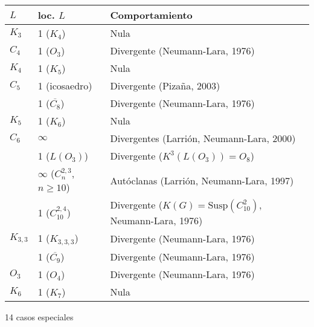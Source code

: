 \documentclass[beamer]{standalone}
\begin{document}
\SetVertexSimple[FillColor=gray, MinSize=0.7pt, InnerSep=0.7pt, LineWidth=0.5pt]


\setlength{\fboxsep}{1pt}

\begin{standaloneframe}
    \begin{center}
    \scriptsize
    \begin{tabular}{|M|M|l|}
      \hline
      $L$ & loc. $L$ & Comportamiento\\
      \hline
      $K_{3}$ & 1 ($K_{4}$) & Nula\\
      $C_{4}$ & 1 ($O_{3}$) & Divergente (Neumann-Lara, 1976)\\
      $K_{4}$ & 1 ($K_{5}$) & Nula\\
      $C_{5}$ & 1 (icosaedro) & Divergente (Pizaña, 2003)\\
       & 1 ($\overline{C_{8}}$) & Divergente (Neumann-Lara, 1976)\\
      $K_{5}$ & 1 ($K_{6}$) & Nula\\
      $C_{6}$ & $\infty$ & Divergentes (Larrión, Neumann-Lara, 2000)\\
       & 1 ($L(O_{3})$) & Divergente ($K^{3}(L(O_{3}))=O_{8}$)\\
       & $\infty$ ($C_{n}^{2,3}$, $n\geq10$) & Autóclanas (Larrión, Neumann-Lara, 1997)\\
       & 1 ($C_{10}^{2,4}$) & Divergente ($K(G)=\mathrm{Susp}(C^{2}_{10})$, Neumann-Lara, 1976)\\
      $K_{3,3}$ & 1 ($K_{3,3,3}$) & Divergente (Neumann-Lara, 1976)\\
       & 1 ($\overline{C_{9}}$) & Divergente (Neumann-Lara, 1976)\\
      $O_{3}$ & 1 ($O_{4}$) & Divergente (Neumann-Lara, 1976)\\
      $K_{6}$ & 1 ($K_{7}$) & Nula\\
      \hline
    \end{tabular}

    \bigskip
    \small

    14 casos especiales
  \end{center}
\end{standaloneframe}
\end{document}
